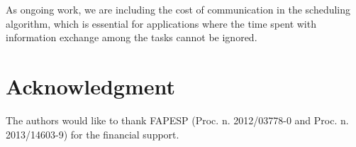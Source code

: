 \documentclass[journal]{IEEEtran}
\begin{document}
As ongoing work, we are including the cost of communication in the scheduling
algorithm, which is essential for applications where the time spent with
information exchange among the tasks cannot be ignored.

\section*{Acknowledgment}


The authors would like to thank FAPESP (Proc. n. 2012/03778-0 and Proc. n.  2013/14603-9) for the financial support.


\ifCLASSOPTIONcaptionsoff
  \newpage
\fi


%
%

\end{document}
